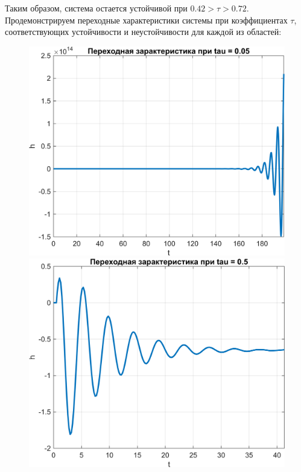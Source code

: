 Таким образом, система остается устойчивой при $0.42 >\tau> 0.72$. Продемонстрируем переходные
характеристики системы при коэффициентах $\tau$, соответствующих устойчивости и неустойчивости для каждой из областей:

\begin{figure}[H]
    \centering
    \begin{minipage}{0.45\textwidth}
        \centering
        \includegraphics[width=\textwidth, trim={0cm 0cm 0cm 0cm}]{../images/3_2_5_cl.png}
    \end{minipage}
    \hfill
    \begin{minipage}{0.45\textwidth}
        \centering
        \includegraphics[width=\textwidth, trim={0cm 0cm 0cm 0cm}]{../images/3_2_6_cl.png}

\end{minipage}
\end{figure}
